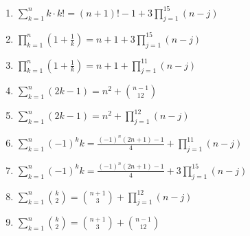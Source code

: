 \documentclass[11pt,a4paper]{article}
\begin{document}
\begin{enumerate}
\item $\displaystyle \sum_{k=1}^{n} k \cdot k! = \left(n + 1\right)! - 1 + 3 \prod_{j=1}^{15} \left(n - j\right)$
\item $\displaystyle \prod_{k=1}^{n} \left(1 + \frac{1}{k}\right) = n + 1 + 3 \prod_{j=1}^{15} \left(n - j\right)$
\item $\displaystyle \prod_{k=1}^{n} \left(1 + \frac{1}{k}\right) = n + 1 + \prod_{j=1}^{11} \left(n - j\right)$
\item $\displaystyle \sum_{k=1}^{n} \left(2k - 1\right) = n^{2} + \binom{n - 1}{12}$
\item $\displaystyle \sum_{k=1}^{n} \left(2k - 1\right) = n^{2} + \prod_{j=1}^{12} \left(n - j\right)$
\item $\displaystyle \sum_{k=1}^{n} \left(-1\right)^{k} k = \frac{\left(-1\right)^{n}\left(2n + 1\right) - 1}{4} + \prod_{j=1}^{11} \left(n - j\right)$
\item $\displaystyle \sum_{k=1}^{n} \left(-1\right)^{k} k = \frac{\left(-1\right)^{n}\left(2n + 1\right) - 1}{4} + 3 \prod_{j=1}^{15} \left(n - j\right)$
\item $\displaystyle \sum_{k=1}^{n} \binom{k}{2} = \binom{n + 1}{3} + \prod_{j=1}^{12} \left(n - j\right)$
\item $\displaystyle \sum_{k=1}^{n} \binom{k}{2} = \binom{n + 1}{3} + \binom{n - 1}{12}$
\end{enumerate}
\end{document}
